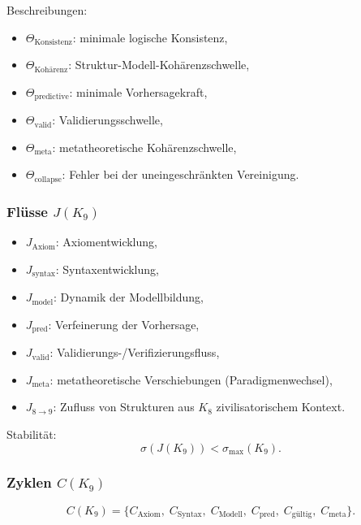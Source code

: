 Beschreibungen:
\begin{itemize}
    \item $\Theta_{\mathrm{Konsistenz}}$: minimale logische Konsistenz,
    \item $\Theta_{\mathrm{Kohärenz}}$: Struktur-Modell-Kohärenzschwelle,
    \item $\Theta_{\mathrm{predictive}}$: minimale Vorhersagekraft,
    \item $\Theta_{\mathrm{valid}}$: Validierungsschwelle,
    \item $\Theta_{\mathrm{meta}}$: metatheoretische Kohärenzschwelle,
    \item $\Theta_{\mathrm{collapse}}$: Fehler bei der uneingeschränkten Vereinigung.
\end{itemize}

\subsubsection{Flüsse \texorpdfstring{$J(K_9)$}{J(K_9)}}

\begin{itemize}
    \item $J_{\mathrm{Axiom}}$: Axiomentwicklung,
    \item $J_{\mathrm{syntax}}$: Syntaxentwicklung,
    \item $J_{\mathrm{model}}$: Dynamik der Modellbildung,
    \item $J_{\mathrm{pred}}$: Verfeinerung der Vorhersage,
    \item $J_{\mathrm{valid}}$: Validierungs-/Verifizierungsfluss,
    \item $J_{\mathrm{meta}}$: metatheoretische Verschiebungen (Paradigmenwechsel),
    \item $J_{8\to9}$: Zufluss von Strukturen aus $K_8$ zivilisatorischem Kontext.
\end{itemize}

Stabilität:
\[
\sigma(J(K_9)) < \sigma_{\max}(K_9).
\]

\subsubsection{Zyklen \texorpdfstring{$C(K_9)$}{C(K_9)}}

\[
C(K_9)=
\{
C_{\mathrm{Axiom}},\;
C_{\mathrm{Syntax}},\;
C_{\mathrm{Modell}},\;
C_{\mathrm{pred}},\;
C_{\mathrm{gültig}},\;
C_{\mathrm{meta}}
\}.
\]

